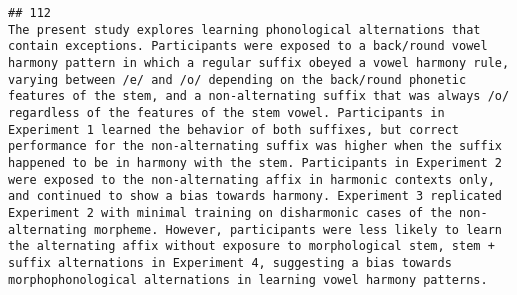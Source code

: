 \documentclass[
  english,
  man]{apa6}
\begin{document}
\begin{verbatim}
## 112                                                                                                                                                                                                                                                                                                                                                                                                                                                                                                                                                                                                                                                                                                                                                                                                                                                                                                                                                                                                                                                                                                                                                                                                                                                                                                                                                                                                                                                                                                                                              The present study explores learning phonological alternations that contain exceptions. Participants were exposed to a back/round vowel harmony pattern in which a regular suffix obeyed a vowel harmony rule, varying between /e/ and /o/ depending on the back/round phonetic features of the stem, and a non-alternating suffix that was always /o/ regardless of the features of the stem vowel. Participants in Experiment 1 learned the behavior of both suffixes, but correct performance for the non-alternating suffix was higher when the suffix happened to be in harmony with the stem. Participants in Experiment 2 were exposed to the non-alternating affix in harmonic contexts only, and continued to show a bias towards harmony. Experiment 3 replicated Experiment 2 with minimal training on disharmonic cases of the non-alternating morpheme. However, participants were less likely to learn the alternating affix without exposure to morphological stem, stem + suffix alternations in Experiment 4, suggesting a bias towards morphophonological alternations in learning vowel harmony patterns.

\end{verbatim}
\end{document}
